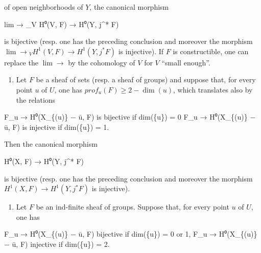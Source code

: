 \documentclass[
]{article}
\newenvironment{Shaded}{}{}
\newcommand{\NormalTok}[1]{#1}
\providecommand{\tightlist}{%
  \setlength{\itemsep}{0pt}\setlength{\parskip}{0pt}}
\begin{document}
of open neighborhoods of \(Y\), the canonical morphism

\begin{Shaded}
\begin{Highlighting}[]
\NormalTok{lim → \_V H⁰(V, F) → H⁰(Y, j\^{}* F)}
\end{Highlighting}
\end{Shaded}

is bijective (resp. one has the preceding conclusion and moreover the
morphism \(\lim \to {}_{V} H^{1}(V, F) \to H^{1}(Y, j^{*} F)\) is
injective). If \(F\) is constructible, one can replace the \(\lim \to\)
by the cohomology of \(V\) for \(V\) ``small enough''.

\begin{enumerate}
\def\labelenumi{\alph{enumi})}
\setcounter{enumi}{1}
\tightlist
\item
  Let \(F\) be a sheaf of sets (resp. a sheaf of groups) and suppose
  that, for every point \(u\) of \(U\), one has
  \(prof_{u}(F) \geqslant 2 - \dim({u})\), which translates also by the
  relations
\end{enumerate}

\begin{Shaded}
\begin{Highlighting}[]
\NormalTok{F\_u → H⁰(X\_\{(u)\} − ū, F) is bijective if dim(\{u\}) = 0}
\NormalTok{F\_u → H⁰(X\_\{(u)\} − ū, F) is injective if dim(\{u\}) = 1.}
\end{Highlighting}
\end{Shaded}

Then the canonical morphism

\begin{Shaded}
\begin{Highlighting}[]
\NormalTok{H⁰(X, F) → H⁰(Y, j\^{}* F)}
\end{Highlighting}
\end{Shaded}

is bijective (resp. one has the preceding conclusion and moreover the
morphism \(H^{1}(X, F) \to H^{1}(Y, j^{*} F)\) is injective).

\begin{enumerate}
\def\labelenumi{\alph{enumi})}
\setcounter{enumi}{2}
\tightlist
\item
  Let \(F\) be an ind-finite sheaf of groups. Suppose that, for every
  point \(u\) of \(U\), one has
\end{enumerate}

\begin{Shaded}
\begin{Highlighting}[]
\NormalTok{F\_u → H⁰(X\_\{(u)\} − ū, F) bijective if dim(\{u\}) = 0 or 1,}
\NormalTok{F\_u → H⁰(X\_\{(u)\} − ū, F) injective if dim(\{u\}) = 2.}
\end{Highlighting}
\end{Shaded}
\end{document}
